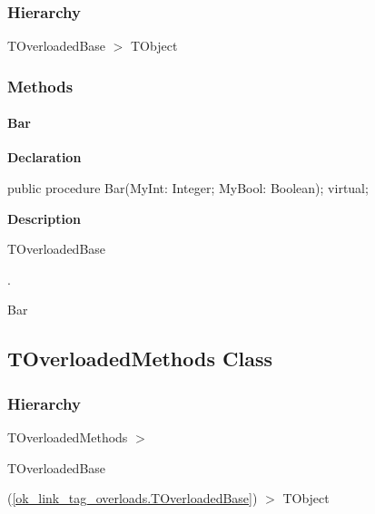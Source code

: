 \documentclass{report}
\begin{document}
\subsubsection*{\large{\textbf{Hierarchy}}\normalsize\hspace{1ex}\hfill}
TOverloadedBase {$>$} TObject
\subsubsection*{\large{\textbf{Methods}}\normalsize\hspace{1ex}\hfill}
\paragraph*{Bar}\hspace*{\fill}

\begin{list}{}{
\setlength{\itemindent}{0cm}
\setlength{\listparindent}{0cm}
\setlength{\leftmargin}{\evensidemargin}
\addtolength{\leftmargin}{\tmplength}
\settowidth{\labelsep}{X}
\addtolength{\leftmargin}{\labelsep}
\setlength{\labelwidth}{\tmplength}
}
\begin{flushleft}
\item[\textbf{Declaration}\hfill]
\begin{ttfamily}
public procedure Bar(MyInt: Integer; MyBool: Boolean); virtual;\end{ttfamily}


\end{flushleft}
\par
\item[\textbf{Description}]
\begin{ttfamily}TOverloadedBase\end{ttfamily}.\begin{ttfamily}Bar\end{ttfamily}

\end{list}
\subsection*{TOverloadedMethods Class}
\subsubsection*{\large{\textbf{Hierarchy}}\normalsize\hspace{1ex}\hfill}
TOverloadedMethods {$>$} \begin{ttfamily}TOverloadedBase\end{ttfamily}(\ref{ok_link_tag_overloads.TOverloadedBase}) {$>$} 
TObject
\end{document}
